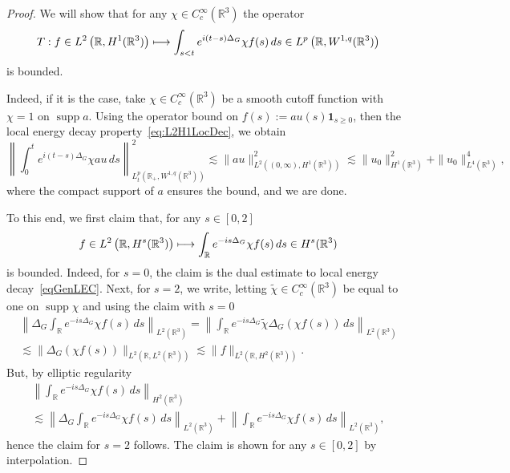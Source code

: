 \documentclass[AHL,Unicode,longabstracts,published]{cedram}
\newcommand*\R{\mathbb{R}}
\DeclareMathOperator{\supp}{supp}
\let\oldmapsto\mapsto
\renewcommand*{\mapsto}{\mathchoice{\longmapsto}{\oldmapsto}{\oldmapsto}{\oldmapsto}}
\begin{document}
\begin{proof}
We will show that for any $\chi \in C^\infty_c(\R^3)$ the operator
\[
T : f \in L^2 \left(\R, H^{1}(\R^3)\right) \mapsto
\int_{s<t} e^{i(t-s)\Delta_G} \chi f(s) \, ds \in L^p\left (\R, W^{1,q}(\R^3)\right)
\]
is bounded.

Indeed, if it is the case, take $\chi \in C^\infty_c(\R^3)$ be a smooth cutoff function with $\chi = 1$ on $\supp a$. Using the operator bound on $f(s) := au(s) \mathbf 1_{s \geq 0}$, then the local energy decay property~\eqref{eq:L2H1LocDec}, we obtain
\begin{equation*}
\left\| \int_0^t e^{i(t-s)\Delta_G} \chi a u \, ds \right\|^2_{L_t^p\left(\R_+, W^{1,q}(\R^3)\right)} \lesssim \| a u \|^2_{L^2\left((0, \infty), H^{1}(\R^3)\right)} \lesssim \| u_0 \|^2_{H^1(\R^3)} + \| u_0 \|^4_{L^4(\R^3)},
\end{equation*}
where the compact support of $a$ ensures the bound, and we are done.

To this end, we first claim that, for any $s\in[0,2]$
\begin{equation}\label{eq:smooth_bdd}
f \in L^2 \left(\R, H^{s}(\R^3)\right) \mapsto
\int_{\R} e^{-is\Delta_G} \chi f(s) \, ds \in H^s(\R^3)
\end{equation}
is bounded. Indeed, for $s = 0$, the claim is the dual estimate to local energy decay~\eqref{eqGenLEC}. Next, for $s=2$, we write, letting $\widetilde \chi \in C^\infty_c(\R^3)$ be equal to one on $\supp\chi$ and using the claim with $s=0$
\begin{multline*}
\left\| \Delta_G \int_{\R} e^{-is\Delta_G} \chi f(s) \, ds\right\|_{L^2(\R^3)} = \left\| \int_{\R} e^{-is\Delta_G} \widetilde \chi \Delta_G(\chi f(s)) \, ds\right\|_{L^2(\R^3)} \\
\lesssim \| \Delta_G(\chi f(s)) \|_{L^2(\R, L^2(\R^3))} \lesssim \| f \|_{L^2(\R, H^{2}(\R^3))}.
\end{multline*}
But, by elliptic regularity
\begin{multline*}
\left\| \int_{\R} e^{-is\Delta_G} \chi f(s) \, ds\right\|_{H^2(\R^3)}\\
\lesssim\left\| \Delta_G \int_{\R} e^{-is\Delta_G} \chi f(s) \, ds\right\|_{L^2(\R^3)} +
\left\| \int_{\R} e^{-is\Delta_G} \chi f(s) \, ds\right\|_{L^2(\R^3)},
\end{multline*}
hence the claim for $s=2$ follows. The claim is shown for any $s\in[0,2]$ by interpolation.


\end{proof}
\end{document}
